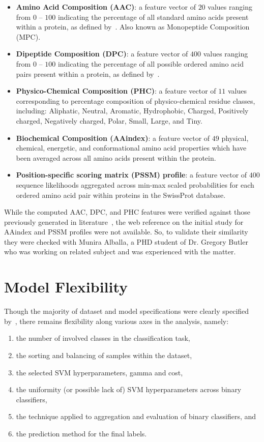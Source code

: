 \begin{itemize}
\item \textbf{Amino Acid Composition (AAC)}: a feature vector of $20$ values ranging from $0$ -- $100$ indicating the
percentage of all standard amino acids present within a protein, as defined by~\cite{gromiha2010protein}. Also known
as Monopeptide Composition (MPC).
\item \textbf{Dipeptide Composition (DPC)}: a feature vector of $400$ values ranging from $0$ -- $100$ indicating the
percentage of all possible ordered amino acid pairs present within a protein, as defined by~\cite{gromiha2010protein}.
\item \textbf{Physico-Chemical Composition (PHC)}: a feature vector of $11$ values corresponding
to percentage composition of physico-chemical residue classes, including: Aliphatic, Neutral, Aromatic, Hydrophobic, Charged, Positively charged,
Negatively charged, Polar, Small, Large, and Tiny. 
\item \textbf{Biochemical Composition (AAindex)}: a feature vector of $49$ physical, chemical, energetic, and
conformational amino acid properties which have been averaged across all amino acids present within the protein.
\item \textbf{Position-specific scoring matrix (PSSM) profile}: a feature vector of $400$ sequence
likelihoods aggregated across min-max scaled probabilities for each ordered amino acid pair within
proteins in the SwissProt database.
\end{itemize}

While the computed AAC, DPC, and PHC features were verified against those previously generated 
in literature~\cite{mishra_prediction_2014}, the 
web reference on the initial study for AAindex and PSSM profiles were not available. So, to validate their similarity 
they were checked with Munira Alballa, a PHD student of Dr. Gregory Butler who was working on related subject \cite{alballa2020trancep}
and was experienced with the matter.


\section{Model Flexibility}
\label{sec:modelflex}
Though the majority of dataset and model specifications were clearly specified by~\cite{mishra_prediction_2014}, there
remains flexibility along various axes in the analysis, namely:

\begin{enumerate}
\item the number of involved classes in the classification task,
\item the sorting and balancing of samples within the dataset,
\item the selected SVM hyperparameters, gamma and cost,
\item the uniformity (or possible lack of) SVM hyperparameters across binary classifiers,
\item the technique applied to aggregation and evaluation of binary classifiers, and
\item the prediction method for the final labels.
\end{enumerate}

